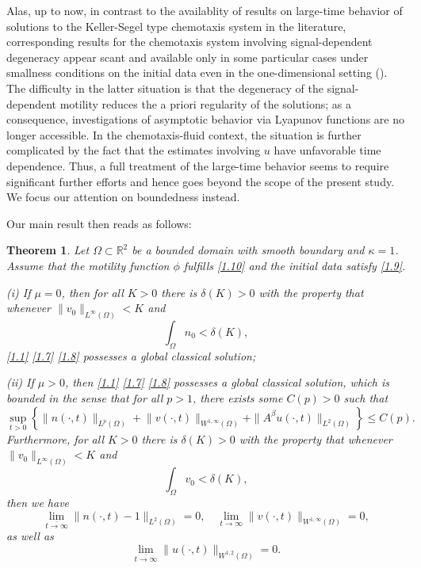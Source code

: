 \documentclass[12pt]{article}
\theoremstyle{plain}
\newtheorem{theorem}{Theorem}[section]
\theoremstyle{definition}
\numberwithin{equation}{section}
\begin{document}
Alas, up to now, in contrast to the availablity of results on large-time behavior of solutions to the Keller-Segel type chemotaxis system in the literature,
corresponding results for the chemotaxis system involving signal-dependent degeneracy appear scant and available only in some particular cases under smallness conditions on the initial data even in the one-dimensional setting (\cite{WinklerAIHP,PL,WinklerTAMS1}). The difficulty in the latter situation is that the degeneracy of the signal-dependent motility
reduces the a priori regularity of the solutions; as a consequence, investigations of asymptotic behavior via Lyapunov functions are no longer accessible.
In the chemotaxis-fluid context, the situation is further complicated by the fact that the estimates involving $u$ have unfavorable time dependence.
Thus, a full treatment of the large-time behavior seems to require significant further
efforts and hence goes beyond the scope of the present study. We focus our attention on boundedness instead.

Our main result then reads as follows:
\begin{theorem}
	Let $\Omega\subset\mathbb{R}^2$ be a bounded domain with smooth boundary and $\kappa=1$.
Assume that the motility function $\phi$ fulfills \eqref{1.10} and the initial data satisfy
\eqref{1.9}.

(i) If $\mu=0$, then for all $K>0$ there is $\delta(K)>0$ with  the property that
 whenever $\|v_{0}\|_{L^{\infty}(\Omega)}<K$ and
	\begin{equation}\label{1.11}
		\int_{\Omega}n_0< \delta(K),
	\end{equation}
  \eqref{1.1} \eqref{1.7} \eqref{1.8}  possesses a global classical solution;

(ii) If $\mu>0$, then \eqref{1.1} \eqref{1.7} \eqref{1.8}   possesses a global classical solution, which is bounded in the sense that for all $p>1$, there exists some $C(p)>0$ such that
 \begin{equation}\label{1.12}
	\sup_{t>0}\left\{\|n(\cdot,t)\|_{L^p(\Omega)}\!
+\!\|v(\cdot,t)\|_{W^{1,\infty}(\Omega)}+\|A^\beta u(\cdot,t)\|_{L^2(\Omega)}\right\}\leq C(p).
\end{equation}
 Furthermore, for all $K>0$ there is $\delta(K)>0$ with  the property that
 whenever $\|v_{0}\|_{L^{\infty}(\Omega)}<K$ and
	\begin{equation}\label{1.13}
		\int_{\Omega} v_0< \delta(K),
	\end{equation}
then we have $$
\displaystyle\lim_{ \overline{t\rightarrow \infty}} \|n(\cdot,t)-1\|_{L^2(\Omega)}= 0,\quad
\displaystyle\lim_{t\rightarrow \infty} \|v(\cdot,t)\|_{W^{1,\infty}(\Omega)} =0, $$
as well as
$$
\displaystyle\lim_{ \overline{t\rightarrow \infty}} \|u(\cdot,t)\|_{W^{1,2}(\Omega)}=0.
$$
\end{theorem}
\vskip1mm
\end{document}
